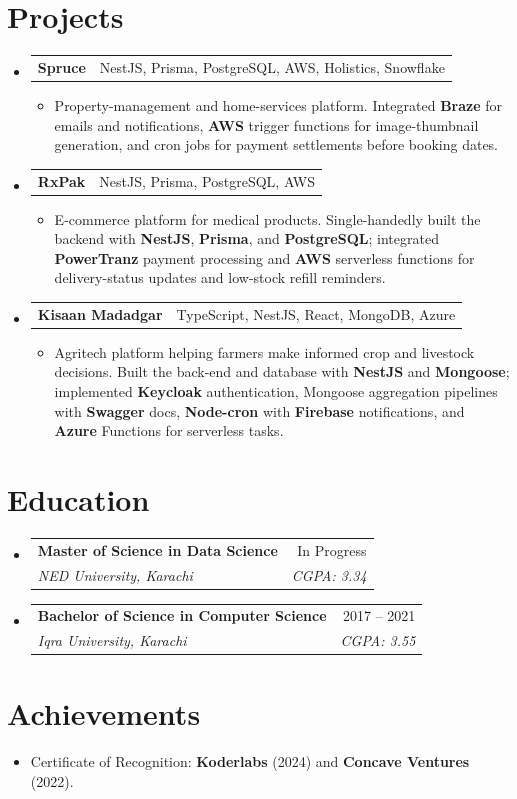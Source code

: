 \documentclass[a4paper,11pt]{article}
\makeatletter
\newcommand{\resumeItem}[1]{\item\small{#1}}
\newcommand{\resumeItemListStart}{\begin{itemize}[leftmargin=0.2in, rightmargin=0.11in, itemsep=1pt, topsep=2pt, parsep=0pt]}
\newcommand{\resumeItemListEnd}{\end{itemize}}
\newcommand{\resumeQuadHeading}[4]{
  \item
  \begin{tabular*}{0.96\textwidth}[t]{l@{\extracolsep{\fill}}r}
    \textbf{#1} & #2 \\
    \textit{\small#3} & \textit{\small #4} \\
  \end{tabular*}\vspace{-4pt}
}
\newcommand{\resumeProjectHeading}[2]{
  \item
  \needspace{3.5\baselineskip}
  \begin{tabular*}{0.96\textwidth}[t]{l@{\extracolsep{\fill}}r}
    \textbf{\small#1} & {\small#2} \\
  \end{tabular*}\vspace{-4pt}
}
\newcommand{\resumeHeadingListStart}{\begin{itemize}[leftmargin=0in, label={}, topsep=2pt, itemsep=0pt]}
\newcommand{\resumeHeadingListEnd}{\end{itemize}}
\makeatother
\begin{document}
\section{Projects}
\resumeHeadingListStart{}
  \resumeProjectHeading{Spruce}{NestJS, Prisma, PostgreSQL, AWS, Holistics, Snowflake}
  \resumeItemListStart{}
    \resumeItem{Property-management and home-services platform. Integrated \textbf{Braze} for emails and notifications, \textbf{AWS} trigger functions for image-thumbnail generation, and cron jobs for payment settlements before booking dates.}
  \resumeItemListEnd{}
  \resumeProjectHeading{RxPak}{NestJS, Prisma, PostgreSQL, AWS}
  \resumeItemListStart{}
    \resumeItem{E-commerce platform for medical products. Single-handedly built the backend with \textbf{NestJS}, \textbf{Prisma}, and \textbf{PostgreSQL}; integrated \textbf{PowerTranz} payment processing and \textbf{AWS} serverless functions for delivery-status updates and low-stock refill reminders.}
  \resumeItemListEnd{}
  \resumeProjectHeading{Kisaan Madadgar}{TypeScript, NestJS, React, MongoDB, Azure}
  \resumeItemListStart{}
    \resumeItem{Agritech platform helping farmers make informed crop and livestock decisions. Built the back-end and database with \textbf{NestJS} and \textbf{Mongoose}; implemented \textbf{Keycloak} authentication, Mongoose aggregation pipelines with \textbf{Swagger} docs, \textbf{Node-cron} with \textbf{Firebase} notifications, and \textbf{Azure} Functions for serverless tasks.}
  \resumeItemListEnd{}
\resumeHeadingListEnd{}

\section{Education}
\resumeHeadingListStart{}
  \resumeQuadHeading{Master of Science in Data Science}{In Progress}
  {NED University, Karachi}{CGPA: 3.34}
  \resumeQuadHeading{Bachelor of Science in Computer Science}{2017 -- 2021}
  {Iqra University, Karachi}{CGPA: 3.55}
\resumeHeadingListEnd{}

\section{Achievements}
\resumeItemListStart{}
  \resumeItem{Certificate of Recognition: \textbf{Koderlabs} (2024) and \textbf{Concave Ventures} (2022).}
\resumeItemListEnd{}
\end{document}
